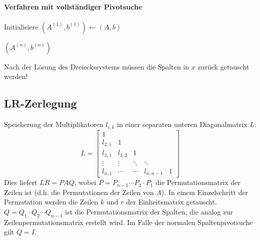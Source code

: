 					\paragraph{Verfahren mit vollständiger Pivotsuche}
						\begin{algorithm}[H]
							Initialisiere \( (A^{(1)}, b^{(1)}) \gets (A, b) \)


							\Return \( (A^{(n)}, b^{(n)}) \)
						\end{algorithm}
						Nach der Lösung des Dreieckssystems müssen die Spalten in \(x\) zurück getauscht werden!

			\subsection{LR-Zerlegung}
				Speicherung der Multiplikatoren \( l_{i,k} \) in einer separaten unteren Diagonalmatrix \(L\):
				\begin{equation*}
					L =
					\begin{bmatrix}
						1       &         &        &           &   \\
						l_{2,1} & 1       &        &           &   \\
						l_{3,1} & l_{3,2} & 1      &           &   \\
						\vdots  & \vdots  & \ddots & \ddots    &   \\
						l_{n,1} & \cdots  & \cdots & l_{n,n-1} & 1
					\end{bmatrix}
				\end{equation*}
				Dies liefert \( LR = PAQ \), wobei \( P = P_{n-1} \cdots P_2 \cdot P_1 \) die Permutationsmatrix der Zeilen ist (d.h. die Permutationen der Zeilen von \(A\)). In einem Einzelschritt der Permutation werden die Zeilen \(k\) und \(r\) der Einheitsmatrix getauscht. \( Q = Q_1 \cdot Q_2 \cdots Q_{n-1} \) ist die Permutationsmatrix der Spalten, die analog zur Zeilenpermutationsmatrix erstellt wird. Im Falle der normalen Spaltenpivotsuche gilt \( Q = I \).

